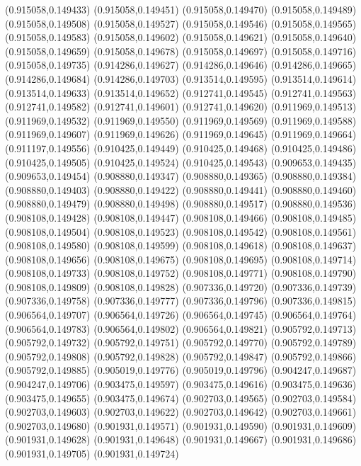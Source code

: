 (0.915058,0.149433)
(0.915058,0.149451)
(0.915058,0.149470)
(0.915058,0.149489)
(0.915058,0.149508)
(0.915058,0.149527)
(0.915058,0.149546)
(0.915058,0.149565)
(0.915058,0.149583)
(0.915058,0.149602)
(0.915058,0.149621)
(0.915058,0.149640)
(0.915058,0.149659)
(0.915058,0.149678)
(0.915058,0.149697)
(0.915058,0.149716)
(0.915058,0.149735)
(0.914286,0.149627)
(0.914286,0.149646)
(0.914286,0.149665)
(0.914286,0.149684)
(0.914286,0.149703)
(0.913514,0.149595)
(0.913514,0.149614)
(0.913514,0.149633)
(0.913514,0.149652)
(0.912741,0.149545)
(0.912741,0.149563)
(0.912741,0.149582)
(0.912741,0.149601)
(0.912741,0.149620)
(0.911969,0.149513)
(0.911969,0.149532)
(0.911969,0.149550)
(0.911969,0.149569)
(0.911969,0.149588)
(0.911969,0.149607)
(0.911969,0.149626)
(0.911969,0.149645)
(0.911969,0.149664)
(0.911197,0.149556)
(0.910425,0.149449)
(0.910425,0.149468)
(0.910425,0.149486)
(0.910425,0.149505)
(0.910425,0.149524)
(0.910425,0.149543)
(0.909653,0.149435)
(0.909653,0.149454)
(0.908880,0.149347)
(0.908880,0.149365)
(0.908880,0.149384)
(0.908880,0.149403)
(0.908880,0.149422)
(0.908880,0.149441)
(0.908880,0.149460)
(0.908880,0.149479)
(0.908880,0.149498)
(0.908880,0.149517)
(0.908880,0.149536)
(0.908108,0.149428)
(0.908108,0.149447)
(0.908108,0.149466)
(0.908108,0.149485)
(0.908108,0.149504)
(0.908108,0.149523)
(0.908108,0.149542)
(0.908108,0.149561)
(0.908108,0.149580)
(0.908108,0.149599)
(0.908108,0.149618)
(0.908108,0.149637)
(0.908108,0.149656)
(0.908108,0.149675)
(0.908108,0.149695)
(0.908108,0.149714)
(0.908108,0.149733)
(0.908108,0.149752)
(0.908108,0.149771)
(0.908108,0.149790)
(0.908108,0.149809)
(0.908108,0.149828)
(0.907336,0.149720)
(0.907336,0.149739)
(0.907336,0.149758)
(0.907336,0.149777)
(0.907336,0.149796)
(0.907336,0.149815)
(0.906564,0.149707)
(0.906564,0.149726)
(0.906564,0.149745)
(0.906564,0.149764)
(0.906564,0.149783)
(0.906564,0.149802)
(0.906564,0.149821)
(0.905792,0.149713)
(0.905792,0.149732)
(0.905792,0.149751)
(0.905792,0.149770)
(0.905792,0.149789)
(0.905792,0.149808)
(0.905792,0.149828)
(0.905792,0.149847)
(0.905792,0.149866)
(0.905792,0.149885)
(0.905019,0.149776)
(0.905019,0.149796)
(0.904247,0.149687)
(0.904247,0.149706)
(0.903475,0.149597)
(0.903475,0.149616)
(0.903475,0.149636)
(0.903475,0.149655)
(0.903475,0.149674)
(0.902703,0.149565)
(0.902703,0.149584)
(0.902703,0.149603)
(0.902703,0.149622)
(0.902703,0.149642)
(0.902703,0.149661)
(0.902703,0.149680)
(0.901931,0.149571)
(0.901931,0.149590)
(0.901931,0.149609)
(0.901931,0.149628)
(0.901931,0.149648)
(0.901931,0.149667)
(0.901931,0.149686)
(0.901931,0.149705)
(0.901931,0.149724)
